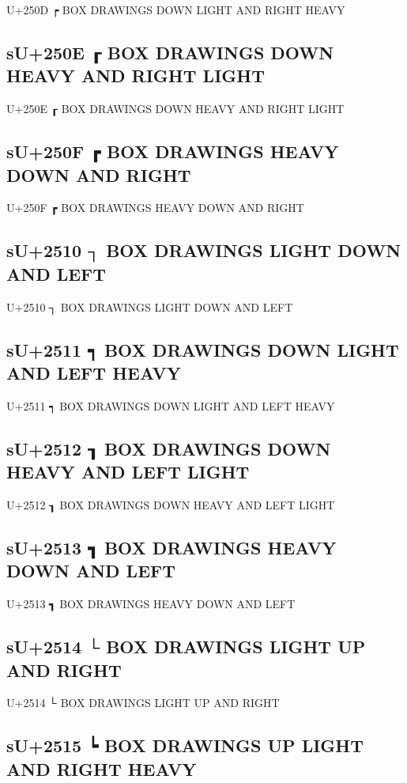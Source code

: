 U+250D ┍ BOX DRAWINGS DOWN LIGHT AND RIGHT HEAVY

\subsection{sU+250E ┎ BOX DRAWINGS DOWN HEAVY AND RIGHT LIGHT}

U+250E ┎ BOX DRAWINGS DOWN HEAVY AND RIGHT LIGHT

\subsection{sU+250F ┏ BOX DRAWINGS HEAVY DOWN AND RIGHT}

U+250F ┏ BOX DRAWINGS HEAVY DOWN AND RIGHT

\subsection{sU+2510 ┐ BOX DRAWINGS LIGHT DOWN AND LEFT}

U+2510 ┐ BOX DRAWINGS LIGHT DOWN AND LEFT

\subsection{sU+2511 ┑ BOX DRAWINGS DOWN LIGHT AND LEFT HEAVY}

U+2511 ┑ BOX DRAWINGS DOWN LIGHT AND LEFT HEAVY

\subsection{sU+2512 ┒ BOX DRAWINGS DOWN HEAVY AND LEFT LIGHT}

U+2512 ┒ BOX DRAWINGS DOWN HEAVY AND LEFT LIGHT

\subsection{sU+2513 ┓ BOX DRAWINGS HEAVY DOWN AND LEFT}

U+2513 ┓ BOX DRAWINGS HEAVY DOWN AND LEFT

\subsection{sU+2514 └ BOX DRAWINGS LIGHT UP AND RIGHT}

U+2514 └ BOX DRAWINGS LIGHT UP AND RIGHT

\subsection{sU+2515 ┕ BOX DRAWINGS UP LIGHT AND RIGHT HEAVY}

